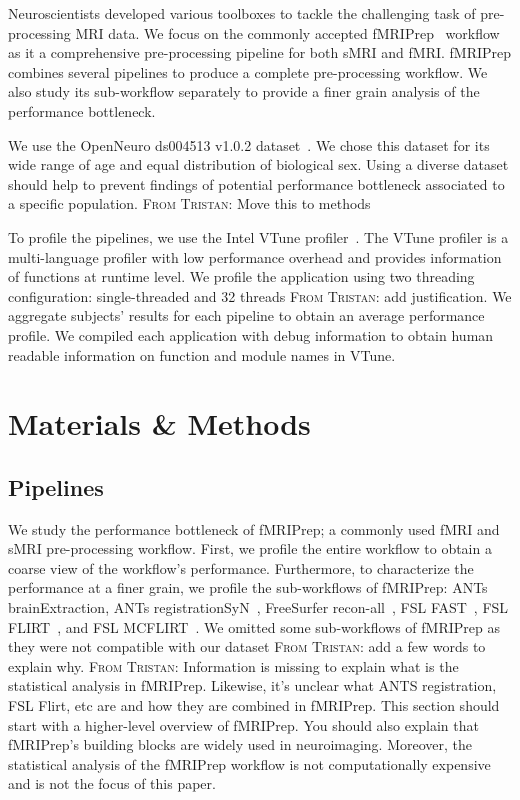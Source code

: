 \documentclass[conference]{IEEEtran}
\newcommand{\TG}[1]{\color{blue}\textsc{From Tristan: }#1\color{black}}
\begin{document}
Neuroscientists developed various toolboxes to tackle the challenging task of pre-processing MRI data. We focus on the commonly accepted fMRIPrep~\cite{Esteban2019-bl} workflow as it a comprehensive pre-processing pipeline for both sMRI and fMRI. fMRIPrep combines several pipelines to produce a complete pre-processing workflow. We also study its sub-workflow separately to provide a finer grain analysis of the performance bottleneck.

We use the OpenNeuro ds004513 v1.0.2 dataset~\cite{ds004513:1.0.2}. We chose this dataset for its wide range of age and equal distribution of biological sex. Using a diverse dataset should help to prevent findings of potential performance bottleneck associated to a specific population. \TG{Move this to methods}

To profile the pipelines, we use the Intel VTune profiler~\cite{vtune-profiler}. The VTune profiler is a multi-language profiler with low performance overhead and provides information of functions at runtime level. We profile the application using two threading configuration: single-threaded and 32 threads \TG{add justification}. We aggregate subjects' results for each pipeline to obtain an average performance profile. We compiled each application with debug information to obtain human readable information on function and module names in VTune.

\section{Materials \& Methods}
\subsection{Pipelines}
We study the performance bottleneck of fMRIPrep; a commonly used fMRI and sMRI pre-processing workflow. First, we profile the entire workflow to obtain a coarse view of the workflow's performance. Furthermore, to characterize the performance at a finer grain, we profile the sub-workflows of fMRIPrep: ANTs brainExtraction, ANTs registrationSyN~\cite{Avants2008-ea}, FreeSurfer recon-all~\cite{Dale1999-wu}, FSL FAST~\cite{Zhang2001-hx}, FSL FLIRT~\cite{Jenkinson2002-od,Jenkinson2001-eu,Greve2009-dw}, and FSL MCFLIRT~\cite{Jenkinson2002-od}. We omitted some sub-workflows of fMRIPrep as they were not compatible with our dataset \TG{add a few words to explain why}. \TG{Information is missing to explain what is the statistical analysis in fMRIPrep. Likewise, it's unclear what ANTS registration, FSL Flirt, etc are and how they are combined in fMRIPrep. This section should start with a higher-level overview of fMRIPrep. You should also explain that fMRIPrep's building blocks are widely used in neuroimaging.} Moreover, the statistical analysis of the fMRIPrep workflow is not computationally expensive and is not the focus of this paper.
\end{document}
